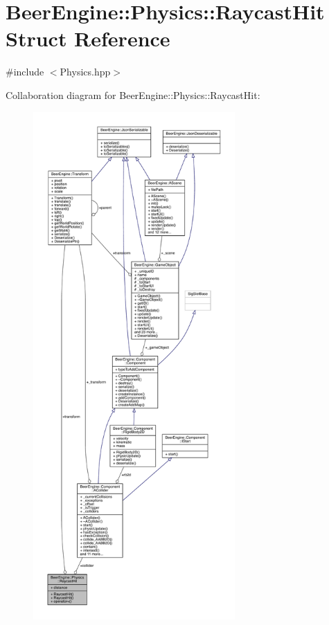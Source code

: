 \hypertarget{struct_beer_engine_1_1_physics_1_1_raycast_hit}{}\section{Beer\+Engine\+:\+:Physics\+:\+:Raycast\+Hit Struct Reference}
\label{struct_beer_engine_1_1_physics_1_1_raycast_hit}


{\ttfamily \#include $<$Physics.\+hpp$>$}



Collaboration diagram for Beer\+Engine\+:\+:Physics\+:\+:Raycast\+Hit\+:\nopagebreak
\begin{figure}[H]
\begin{center}
\leavevmode
\includegraphics[height=550pt]{struct_beer_engine_1_1_physics_1_1_raycast_hit__coll__graph}
\end{center}
\end{figure}
